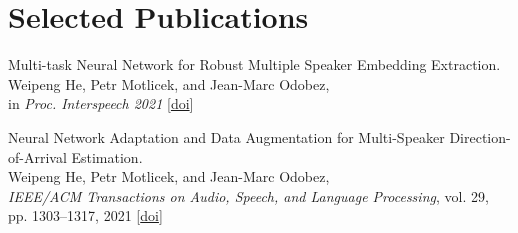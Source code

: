 \documentclass[a4paper,9pt]{extarticle} %
\begin{document}


\section{Selected Publications}
\begin{enumerate}[label={[\arabic*]}]

  \item Multi-task Neural Network for Robust Multiple Speaker Embedding Extraction. \\
        Weipeng He, Petr Motlicek, and Jean-Marc Odobez, \\
        in \textit{Proc. Interspeech 2021}
        [\href{https://doi.org/10.21437/Interspeech.2021-1769}{doi}]

  \item Neural Network Adaptation and Data Augmentation for Multi-Speaker Direction-of-Arrival Estimation. \\
        Weipeng He, Petr Motlicek, and Jean-Marc Odobez, \\
        \textit{IEEE/ACM Transactions on Audio, Speech, and Language Processing}, vol. 29, pp. 1303–1317, 2021
        [\href{https://doi.org/10.1109/TASLP.2021.3060257}{doi}]



\end{enumerate}
\end{document}
